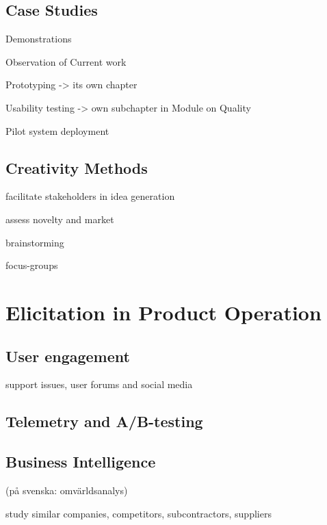 \subsection{Case Studies}

Demonstrations

Observation of Current work 

Prototyping -> its own chapter 

Usability testing -> own subchapter in Module on Quality

Pilot system deployment

\subsection{Creativity Methods}

facilitate stakeholders in idea generation 

assess novelty and market 

brainstorming

focus-groups



\section{Elicitation in Product Operation}

\subsection{User engagement}
support issues, user forums and social media

\subsection{Telemetry and A/B-testing}

\subsection{Business Intelligence}
(på svenska: omvärldsanalys)

study similar companies, competitors, subcontractors, suppliers 

